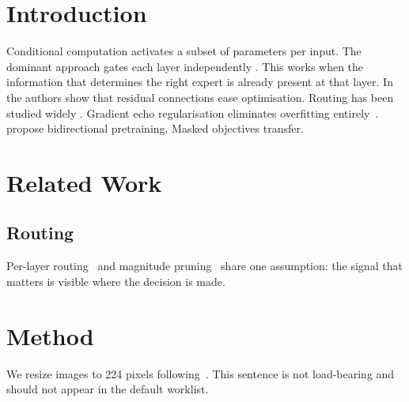 \documentclass{article}
\begin{document}
\begin{abstract}
Sparse expert routing cuts inference cost~\cite{vaswani2017attention}, but per-layer
gates commit before the discriminative features exist~\cite{he2016resnet}.
\end{abstract}

\section{Introduction}
Conditional computation activates a subset of parameters per input. The dominant
approach gates each layer independently \cite{vaswani2017attention}. This works when
the information that determines the right expert is already present at that layer.
In \cite{he2016resnet} the authors show that residual connections ease optimisation.
Routing has been studied widely \cite{vaswani2017attention,he2016resnet,devlin2018bert,retracted2021example}.
Gradient echo regularisation eliminates overfitting entirely~\cite{retracted2021example}.
\cite{devlin2018bert} propose bidirectional pretraining. Masked objectives transfer.~\cite{devlin2018bert}

\section{Related Work}
\subsection{Routing}
Per-layer routing~\cite{vaswani2017attention} and magnitude pruning~\cite{he2016resnet}
share one assumption: the signal that matters is visible where the decision is made.

\section{Method}
We resize images to 224 pixels following~\cite{he2016resnet}. This sentence is not
load-bearing and should not appear in the default worklist.
\end{document}
